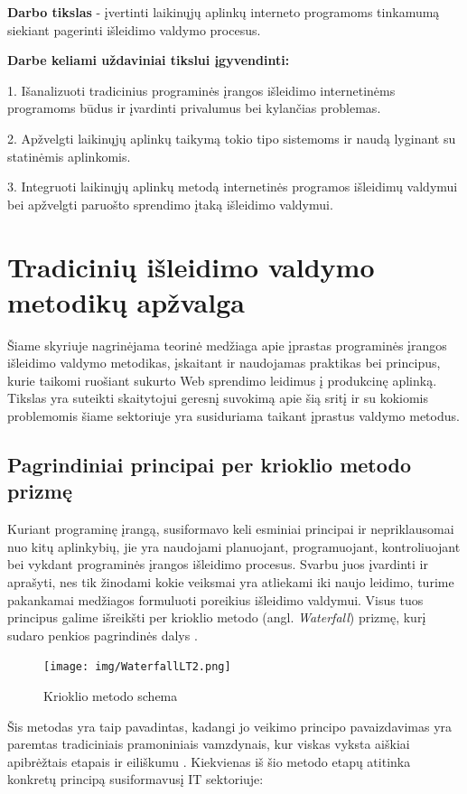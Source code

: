 \documentclass{VUMIFPSkursinis}
\begin{document}
\bigskip

\textbf{Darbo tikslas} - įvertinti laikinųjų aplinkų interneto programoms tinkamumą siekiant pagerinti išleidimo valdymo procesus. 

\textbf{Darbe keliami uždaviniai tikslui įgyvendinti:}

1. Išanalizuoti tradicinius programinės įrangos išleidimo internetinėms programoms būdus ir įvardinti privalumus bei kylančias problemas.

2. Apžvelgti laikinųjų aplinkų taikymą tokio tipo sistemoms ir naudą lyginant su statinėmis aplinkomis.

3. Integruoti laikinųjų aplinkų metodą internetinės programos išleidimų valdymui bei apžvelgti paruošto sprendimo įtaką išleidimo valdymui.

\section{Tradicinių išleidimo valdymo metodikų apžvalga}
Šiame skyriuje nagrinėjama teorinė medžiaga apie įprastas programinės įrangos išleidimo valdymo metodikas, įskaitant ir naudojamas praktikas bei principus, kurie taikomi ruošiant sukurto Web sprendimo leidimus į produkcinę aplinką. Tikslas yra suteikti skaitytojui geresnį suvokimą apie šią sritį ir su kokiomis problemomis šiame sektoriuje yra susiduriama taikant įprastus valdymo metodus.

\subsection{Pagrindiniai principai per krioklio metodo prizmę}
Kuriant programinę įrangą, susiformavo keli esminiai principai ir nepriklausomai nuo kitų aplinkybių, jie yra naudojami planuojant, programuojant, kontroliuojant bei vykdant programinės įrangos išleidimo procesus. Svarbu juos įvardinti ir aprašyti, nes tik žinodami kokie veiksmai yra atliekami iki naujo leidimo, turime pakankamai medžiagos formuluoti poreikius išleidimo valdymui. Visus tuos principus galime išreikšti per krioklio metodo (angl. \textit{Waterfall}) prizmę, kurį sudaro penkios pagrindinės dalys \cite{SaltTrecias}.

\begin{figure}[H]
    \centering
    \texttt{[image: img/WaterfallLT2.png]}
    \caption{Krioklio metodo schema}
    \label{img:mlp}
\end{figure}

Šis metodas yra taip pavadintas, kadangi jo veikimo principo pavaizdavimas yra paremtas tradiciniais pramoniniais vamzdynais, kur viskas vyksta aiškiai apibrėžtais etapais ir eiliškumu \cite{SaltTrecias}. Kiekvienas iš šio metodo etapų atitinka konkretų principą susiformavusį IT sektoriuje:
\end{document}
